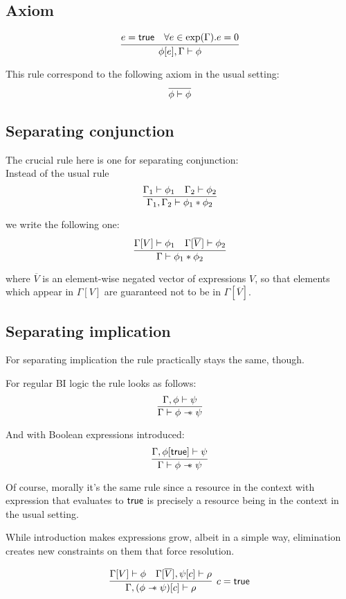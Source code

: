 \subsection{Axiom}

\[\infer{\phi[e], \Gamma \vdash \phi}
      {e = \true &
       \forall e \in \expr(\Gamma). e = 0}\]

This rule correspond to the following axiom in the usual setting:
\[\infer{\phi \vdash \phi}{}\]

\subsection{Separating conjunction}

The crucial rule here is one for separating conjunction:\\
Instead of the usual rule
\[\infer{\Gamma_1, \Gamma_2 \vdash \phi_1 \ast \phi_2}
      {\Gamma_1 \vdash \phi_1 &
       \Gamma_2 \vdash \phi_2}\]

we write the following one:
\[\infer{\Gamma \vdash \phi_1 \ast \phi_2}
      {\Gamma[V] \vdash \phi_1 &
       \Gamma[\overline{V}] \vdash \phi_2}\]

where \(\overline{V}\) is an element-wise negated vector of expressions \(V\), so
that elements which appear in \(\Gamma[V]\) are guaranteed not to be in \(\Gamma[\overline{V}]\).

\subsection{Separating implication}

For separating implication the rule practically stays the same, though.

For regular BI logic the rule looks as follows:
\[
\infer{\Gamma \vdash \phi \wand \psi}
      {\Gamma , \phi \vdash \psi}
\]

And with Boolean expressions introduced:
\[
\infer{\Gamma \vdash \phi \wand \psi}
      {\Gamma , \phi[\true] \vdash \psi}
\]

Of course, morally it's the same rule since a resource in the context with expression that evaluates to \(\textsf{true}\) is precisely a resource being in the context in the usual setting.

While introduction makes expressions grow, albeit in a simple way, elimination creates new constraints on them that force resolution.

\[
\infer[ c = \true ]
      {\Gamma, (\phi \wand \psi)[c] \vdash \rho}
      {\Gamma[V] \vdash \phi &
       \Gamma[\overline{V}], \psi[c] \vdash \rho}
\]

